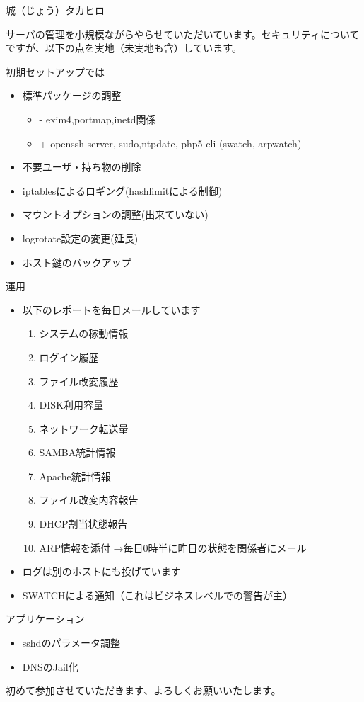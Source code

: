 \documentclass[mingoth,a4paper]{jsarticle}
\begin{document}
\begin{prework*}{ 城（じょう）タカヒロ }
    
    サーバの管理を小規模ながらやらせていただいています。セキュリティについて
    ですが、以下の点を実地（未実地も含）しています。
    
    初期セットアップでは
    \begin{itemize}
          \item 標準パッケージの調整
        \begin{itemize}
              \item - exim4\*,portmap\*,inetd関係
              \item + openssh-server, sudo,ntpdate, php5-cli (swatch, arpwatch)
        \end{itemize}
          \item 不要ユーザ・持ち物の削除
          \item iptablesによるロギング(hashlimitによる制御)
          \item マウントオプションの調整(出来ていない)
          \item logrotate設定の変更(延長)
          \item ホスト鍵のバックアップ
    \end{itemize}
    
    運用
    \begin{itemize}
          \item 以下のレポートを毎日メールしています
        \begin{enumerate}
              \item システムの稼動情報
              \item ログイン履歴
              \item ファイル改変履歴
              \item DISK利用容量
              \item ネットワーク転送量
              \item SAMBA統計情報
              \item Apache統計情報
              \item ファイル改変内容報告
              \item DHCP割当状態報告
              \item ARP情報を添付
            →毎日0時半に昨日の状態を関係者にメール
        \end{enumerate}
          \item ログは別のホストにも投げています
          \item SWATCHによる通知（これはビジネスレベルでの警告が主）
    \end{itemize}
    
    アプリケーション
    \begin{itemize}
          \item sshdのパラメータ調整
          \item DNSのJail化
    \end{itemize}
    
    初めて参加させていただきます、よろしくお願いいたします。
    
\end{prework*}
\end{document}
